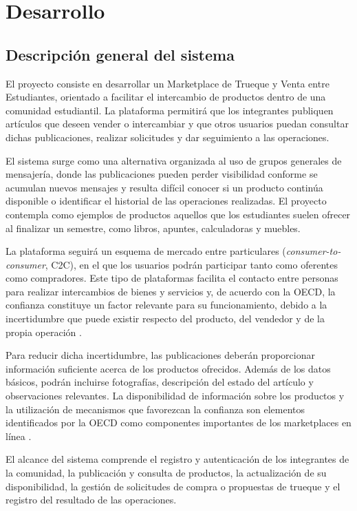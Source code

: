 \documentclass[12pt]{article} %
\begin{document}
\section{Desarrollo}

\subsection{Descripción general del sistema}

El proyecto consiste en desarrollar un Marketplace de Trueque y Venta entre Estudiantes, orientado a facilitar el intercambio de productos dentro de una comunidad estudiantil. La plataforma permitirá que los integrantes publiquen artículos que deseen vender o intercambiar y que otros usuarios puedan consultar dichas publicaciones, realizar solicitudes y dar seguimiento a las operaciones.

El sistema surge como una alternativa organizada al uso de grupos generales de mensajería, donde las publicaciones pueden perder visibilidad conforme se acumulan nuevos mensajes y resulta difícil conocer si un producto continúa disponible o identificar el historial de las operaciones realizadas. El proyecto contempla como ejemplos de productos aquellos que los estudiantes suelen ofrecer al finalizar un semestre, como libros, apuntes, calculadoras y muebles.

La plataforma seguirá un esquema de mercado entre particulares (\textit{consumer-to-consumer}, C2C), en el que los usuarios podrán participar tanto como oferentes como compradores. Este tipo de plataformas facilita el contacto entre personas para realizar intercambios de bienes y servicios y, de acuerdo con la OECD, la confianza constituye un factor relevante para su funcionamiento, debido a la incertidumbre que puede existir respecto del producto, del vendedor y de la propia operación \citep{oecd2017trust, oecd2019trust}.

Para reducir dicha incertidumbre, las publicaciones deberán proporcionar información suficiente acerca de los productos ofrecidos. Además de los datos básicos, podrán incluirse fotografías, descripción del estado del artículo y observaciones relevantes. La disponibilidad de información sobre los productos y la utilización de mecanismos que favorezcan la confianza son elementos identificados por la OECD como componentes importantes de los marketplaces en línea \citep{oecd2017trust, oecd2022marketplaces}.

El alcance del sistema comprende el registro y autenticación de los integrantes de la comunidad, la publicación y consulta de productos, la actualización de su disponibilidad, la gestión de solicitudes de compra o propuestas de trueque y el registro del resultado de las operaciones.
\end{document}
